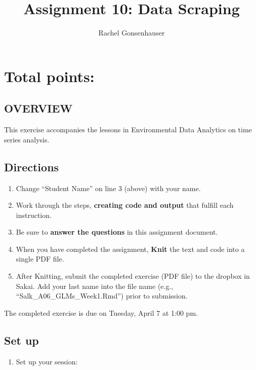 \documentclass[]{article}
\title{Assignment 10: Data Scraping}
\author{Rachel Gonsenhauser}
\date{}
\providecommand{\tightlist}{%
  \setlength{\itemsep}{0pt}\setlength{\parskip}{0pt}}
\begin{document}
\maketitle

\hypertarget{total-points}{%
\section{Total points:}\label{total-points}}

\hypertarget{overview}{%
\subsection{OVERVIEW}\label{overview}}

This exercise accompanies the lessons in Environmental Data Analytics on
time series analysis.

\hypertarget{directions}{%
\subsection{Directions}\label{directions}}

\begin{enumerate}
\def\labelenumi{\arabic{enumi}.}
\tightlist
\item
  Change ``Student Name'' on line 3 (above) with your name.
\item
  Work through the steps, \textbf{creating code and output} that fulfill
  each instruction.
\item
  Be sure to \textbf{answer the questions} in this assignment document.
\item
  When you have completed the assignment, \textbf{Knit} the text and
  code into a single PDF file.
\item
  After Knitting, submit the completed exercise (PDF file) to the
  dropbox in Sakai. Add your last name into the file name (e.g.,
  ``Salk\_A06\_GLMs\_Week1.Rmd'') prior to submission.
\end{enumerate}

The completed exercise is due on Tuesday, April 7 at 1:00 pm.

\hypertarget{set-up}{%
\subsection{Set up}\label{set-up}}

\begin{enumerate}
\def\labelenumi{\arabic{enumi}.}
\tightlist
\item
  Set up your session:
\end{enumerate}
\end{document}
